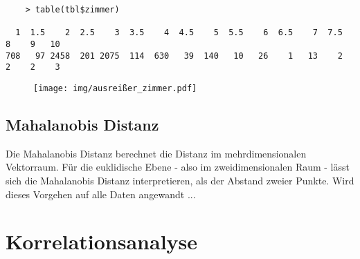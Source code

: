 \begin{verbatim}
	> table(tbl$zimmer)
	
  1  1.5    2  2.5    3  3.5    4  4.5    5  5.5    6  6.5    7  7.5    8    9   10 
708   97 2458  201 2075  114  630   39  140   10   26    1   13    2    2    2    3 
\end{verbatim}
\begin{figure}[h!!]
	\centering
	\texttt{[image: img/ausreißer\_zimmer.pdf]}
	\caption{}
	\label{fig: ausreißer_zimmer}
\end{figure}
\subsection{Mahalanobis Distanz}
Die Mahalanobis Distanz berechnet die Distanz im mehrdimensionalen Vektorraum. Für die euklidische Ebene - also im zweidimensionalen Raum - lässt sich die Mahalanobis Distanz interpretieren, als der Abstand zweier Punkte. Wird dieses Vorgehen auf alle Daten angewandt ...


\section{Korrelationsanalyse}